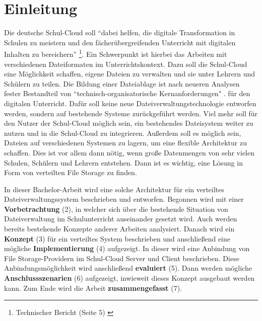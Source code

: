 \section{Einleitung}
\label{sec:intro}

Die deutsche Schul-Cloud soll ``dabei helfen, die digitale Transformation in Schulen zu meistern und den fächerübergreifenden Unterricht mit digitalen Inhalten zu bereichern'' \footnote{ Technischer Bericht (Seite 5) \cite{paper:technischerbericht}}. Ein Schwerpunkt ist hierbei das Arbeiten mit verschiedenen Dateiformaten im Unterrichtskontext. Dazu soll die Schul-Cloud eine Möglichkeit schaffen, eigene Dateien zu verwalten und sie unter Lehrern und Schülern zu teilen. Die Bildung einer Dateiablage ist nach neueren Analysen fester Bestandteil von ``technisch-organisatorische Kernanforderungen" \cite{paper:breiterstolpmannzeising2015}. für den digitalen Unterricht. Dafür soll keine neue Dateiverwaltungstechnologie entworfen werden, sondern auf bestehende Systeme zurückgeführt werden. Viel mehr soll für den Nutzer der Schul-Cloud möglich sein, ein bestehendes Dateisystem weiter zu nutzen und in die Schul-Cloud zu integrieren. Außerdem soll es möglich sein, Dateien auf verschiedenen Systemen zu lagern, um eine flexible Architektur zu schaffen. Dies ist vor allem dann nötig, wenn große Datenmengen von sehr vielen Schulen, Schülern und Lehrern entstehen. Dann ist es wichtig, eine Lösung in Form von verteilten File Storage zu finden. 

In dieser Bachelor-Arbeit wird eine solche Architektur für ein verteiltes Dateiverwaltungssystem beschrieben und entworfen. Begonnen wird mit einer \textbf{Vorbetrachtung} (2), in welcher sich über die bestehende Situation von Dateiverwaltung im Schulunterricht auseinander gesetzt wird. Auch werden bereits bestehende Konzepte anderer Arbeiten analysiert. Danach wird ein \textbf{Konzept} (3) für ein verteiltes System beschrieben und anschließend eine mögliche \textbf{Implementierung} (4)  aufgezeigt. In dieser wird eine Anbindung von File Storage-Providern im Schul-Cloud Server und Client beschrieben. Diese Anbindungsmöglichkeit wird anschließend \textbf{evaluiert} (5). Dann werden mögliche \textbf{Anschlussszenarien} (6) aufgezeigt, inwieweit dieses Konzept ausgebaut werden kann. Zum Ende wird die Arbeit \textbf{zusammengefasst} (7).

\clearpage
